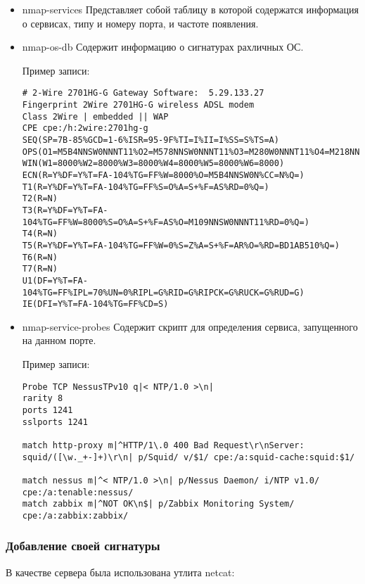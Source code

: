 \documentclass[10pt,a4paper]{article}
\begin{document}
\begin{itemize}
\item {nmap-services}
Представляет собой таблицу в которой содержатся информация о сервисах, типу и номеру порта, и частоте появления.

\item {nmap-os-db}
Содержит информацию о сигнатурах рахличных ОС. 

Пример записи:

\begin{verbatim}
# 2-Wire 2701HG-G Gateway Software:  5.29.133.27
Fingerprint 2Wire 2701HG-G wireless ADSL modem
Class 2Wire | embedded || WAP
CPE cpe:/h:2wire:2701hg-g
SEQ(SP=7B-85%GCD=1-6%ISR=95-9F%TI=I%II=I%SS=S%TS=A)
OPS(O1=M5B4NNSW0NNNT11%O2=M578NNSW0NNNT11%O3=M280W0NNNT11%O4=M218NNSW0NNNT11%O5=M218NNSW0NNNT11%O6=M109NNSNNT11)
WIN(W1=8000%W2=8000%W3=8000%W4=8000%W5=8000%W6=8000)
ECN(R=Y%DF=Y%T=FA-104%TG=FF%W=8000%O=M5B4NNSW0N%CC=N%Q=)
T1(R=Y%DF=Y%T=FA-104%TG=FF%S=O%A=S+%F=AS%RD=0%Q=)
T2(R=N)
T3(R=Y%DF=Y%T=FA-104%TG=FF%W=8000%S=O%A=S+%F=AS%O=M109NNSW0NNNT11%RD=0%Q=)
T4(R=N)
T5(R=Y%DF=Y%T=FA-104%TG=FF%W=0%S=Z%A=S+%F=AR%O=%RD=BD1AB510%Q=)
T6(R=N)
T7(R=N)
U1(DF=Y%T=FA-104%TG=FF%IPL=70%UN=0%RIPL=G%RID=G%RIPCK=G%RUCK=G%RUD=G)
IE(DFI=Y%T=FA-104%TG=FF%CD=S)
\end{verbatim}

\item {nmap-service-probes}
Содержит скрипт для определения сервиса, запущенного на данном порте. 

Пример записи:

\begin{verbatim}
Probe TCP NessusTPv10 q|< NTP/1.0 >\n|
rarity 8
ports 1241
sslports 1241

match http-proxy m|^HTTP/1\.0 400 Bad Request\r\nServer: squid/([\w._+-]+)\r\n| p/Squid/ v/$1/ cpe:/a:squid-cache:squid:$1/

match nessus m|^< NTP/1.0 >\n| p/Nessus Daemon/ i/NTP v1.0/ cpe:/a:tenable:nessus/
match zabbix m|^NOT OK\n$| p/Zabbix Monitoring System/ cpe:/a:zabbix:zabbix/

\end{verbatim}


\end{itemize}

\subsubsection{Добавление своей сигнатуры}

В качестве сервера была использована утлита netcat:
\end{document}
